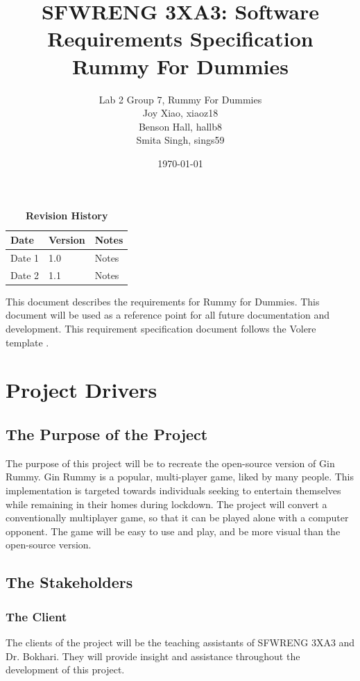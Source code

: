 \documentclass[12pt, titlepage]{article}
\title{SFWRENG 3XA3: Software Requirements Specification\\Rummy For Dummies}
\author{Lab 2 Group 7, Rummy For Dummies
		\\ Joy Xiao, xiaoz18
		\\ Benson Hall, hallb8
		\\ Smita Singh, sings59
}
\date{\today}
\begin{document}
\maketitle

\tableofcontents
\listoftables
\listoffigures

\begin{table}[bp]
\caption{\bf Revision History}
\begin{tabularx}{\textwidth}{p{3cm}p{2cm}X}
\toprule {\bf Date} & {\bf Version} & {\bf Notes}\\
\midrule
Date 1 & 1.0 & Notes\\
Date 2 & 1.1 & Notes\\
\bottomrule
\end{tabularx}
\end{table}

\newpage


This document describes the requirements for Rummy for Dummies.
This document will be used as a reference point for all future documentation and development. This requirement specification document follows the Volere template \cite{volere}.

\section{Project Drivers}

\subsection{The Purpose of the Project}
The purpose of this project will be to recreate the open-source version of Gin Rummy. Gin Rummy is a popular, multi-player game, liked by many people. This implementation is targeted towards individuals seeking to entertain themselves while remaining in their homes during lockdown. The project will convert a conventionally multiplayer game, so that it can be played alone with a computer opponent. The game will be easy to use and play, and be more visual than the open-source version.

\subsection{The Stakeholders}

\subsubsection{The Client}
The clients of the project will be the teaching assistants of SFWRENG 3XA3 and Dr. Bokhari. They will provide insight and assistance throughout the development of this project.
\end{document}
